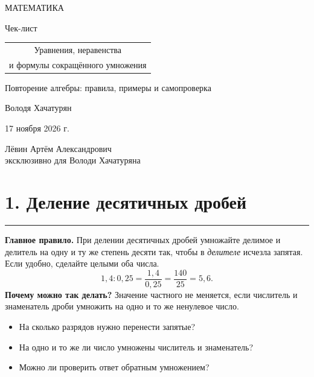 \documentclass[a4paper,11pt]{article}
\newcommand{\sectionline}{\par\vspace{1pt}\noindent\color{accent}\rule{\linewidth}{0.45pt}\color{textgray}\par\vspace{3pt}}
\newcommand{\minititle}[1]{\par\vspace{3pt}{\color{darkaccent}\bfseries #1}\par\vspace{1pt}}
\newcommand{\method}[1]{\textcolor{darkaccent}{\textbf{#1}}}
\newcommand{\topic}[1]{\section*{#1}\sectionline}
\newcommand{\sol}[1]{\[\displaystyle #1\]}
\begin{document}
\thispagestyle{empty}
\begin{center}
\vspace*{22mm}
{\large\color{darkaccent}МАТЕМАТИКА\par}
\vspace{16mm}
{\LARGE Чек-лист\par}
\vspace{14mm}
{\Large\color{accent}\begin{tabular}{c}Уравнения, неравенства\\и формулы сокращённого умножения\end{tabular}\par}
\vspace{15mm}
{\normalsize Повторение алгебры: правила, примеры и самопроверка\par}
\vfill
{\large Володя Хачатурян\par}
\vspace{10mm}
{17 ноября 2026 г.\par}
\vspace{16mm}
{\small Лёвин Артём Александрович\\[3pt]
эксклюзивно для Володи Хачатуряна\par}
\vspace{15mm}
\vspace{6mm}
\end{center}
\clearpage
\setcounter{page}{1}

\topic{1. Деление десятичных дробей}
\method{Главное правило.} При делении десятичных дробей умножайте делимое и делитель на одну и ту же степень десяти так, чтобы в \emph{делителе} исчезла запятая. Если удобно, сделайте целыми оба числа.
\sol{1{,}4:0{,}25=\frac{1{,}4}{0{,}25}=\frac{140}{25}=5{,}6.}
\textbf{Почему можно так делать?} Значение частного не меняется, если числитель и знаменатель дроби умножить на одно и то же ненулевое число.
\minititle{Проверьте себя}
\begin{itemize}
  \item На сколько разрядов нужно перенести запятые?
  \item На одно и то же ли число умножены числитель и знаменатель?
  \item Можно ли проверить ответ обратным умножением?
\end{itemize}
\end{document}
